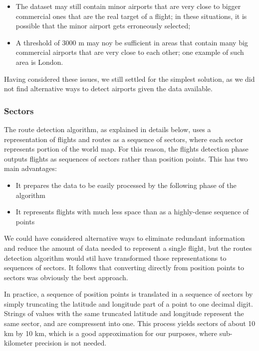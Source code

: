 \documentclass{vldb}
\begin{document}
\begin{itemize}
  \item The dataset may still contain minor airports that are very close to
  bigger commercial ones that are the real target of a flight; in these
  situations, it is possible that the minor airport gets erroneously selected;
  \item A threshold of 3000 m may noy be sufficient in areas that contain many
  big commercial airports that are very close to each other; one example of such
  area is London.
\end{itemize}

Having considered these issues, we still settled for the simplest solution, as
we did not find alternative ways to detect airports given the data available.

\subsubsection{Sectors}

The route detection algorithm, as explained in details below, uses a
representation of flights and routes as a sequence of sectors, where each sector
represents portion of the world map. For this reason, the flights detection
phase outputs flights as sequences of sectors rather than position points. This
has two main advantages:

\begin{itemize}
  \item It prepares the data to be easily processed by the following phase of
  the algorithm
  \item It represents flights with much less space than as a highly-dense
  sequence of points
\end{itemize}

We could have considered alternative ways to eliminate redundant information and
reduce the amount of data needed to represent a single flight, but the routes
detection algorithm would stil have transformed those representations to
sequences of sectors. It follows that converting directly from position points
to sectors was obviously the best approach.

In practice, a sequence of position points is translated in a sequence of
sectors by simply truncating the latitude and longitude part of a point to one
decimal digit. Strings of values with the same truncated latitude and
longitude represent the same sector, and are compressent into one. This process
yields sectors of about 10 km by 10 km, which is a good approximation for our
purposes, where sub-kilometer precision is not needed.
\end{document}
